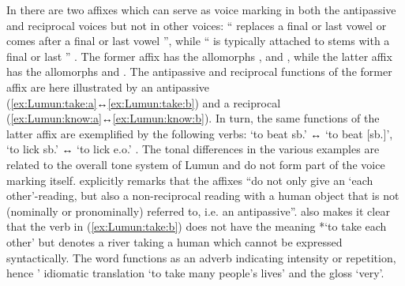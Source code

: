 In  there are two affixes which can serve as voice marking in both the antipassive and reciprocal voices but not in other voices: “ replaces a final or last vowel  or comes after a final or last vowel ”, while “ is typically attached to stems with a final or last ” \citep[550f.]{smits:2017}. The former affix has the allomorphs ,  and , while the latter affix has the allomorphs  and . The antipassive and reciprocal functions of the former affix are here illustrated by an antipassive  (\ref{ex:Lumun:take:a}↔\ref{ex:Lumun:take:b}) and a reciprocal  (\ref{ex:Lumun:know:a}↔\ref{ex:Lumun:know:b}). In turn, the same functions of the latter affix are exemplified by the following verbs:  ‘to beat sb.’ ↔  ‘to beat [sb.]’,  ‘to lick sb.’ ↔  ‘to lick e.o.’ \citep[551, 559, 734]{smits:2017}. The tonal differences in the various examples are related to the overall tone system of Lumun and do not form part of the voice marking itself. \cite[558]{smits:2017} explicitly remarks that the  affixes “do not only give an ‘each other’-reading, but also a non-reciprocal reading with a human object that is not (nominally or pronominally) referred to, i.e. an antipassive”. \citeauthor{smits:2017} also makes it clear that the verb in (\ref{ex:Lumun:take:b}) does not have the meaning *‘to take each other’ but denotes a river taking a human  which cannot be expressed syntactically. The word  functions as an adverb indicating intensity or repetition, hence \citeauthor{smits:2017}’ idiomatic translation ‘to take many people’s lives’ and the gloss ‘very’. 


